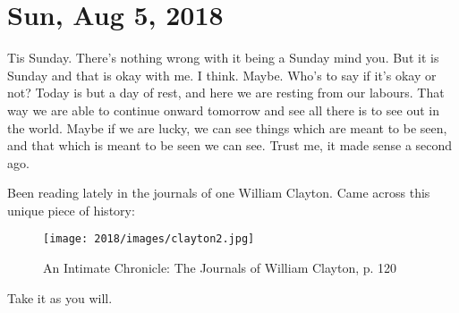 \section{Sun, Aug 5, 2018}

Tis Sunday. There's nothing wrong with it being a Sunday mind you. But it is Sunday
and that is okay with me. I think. Maybe. Who's to say if it's okay or not? Today is
but a day of rest, and here we are resting from our labours. That way we are able to
continue onward tomorrow and see all there is to see out in the world. Maybe if we
are lucky, we can see things which are meant to be seen, and that which is meant to
be seen we can see. Trust me, it made sense a second ago.

Been reading lately in the journals of one William Clayton. Came across this unique
piece of history:

\begin{figure}[h!]
  \centering
  \texttt{[image: 2018/images/clayton2.jpg]}
  \caption{An Intimate Chronicle: The Journals of William Clayton, p. 120}
  \label{fig:clayton2}
\end{figure}

Take it as you will.